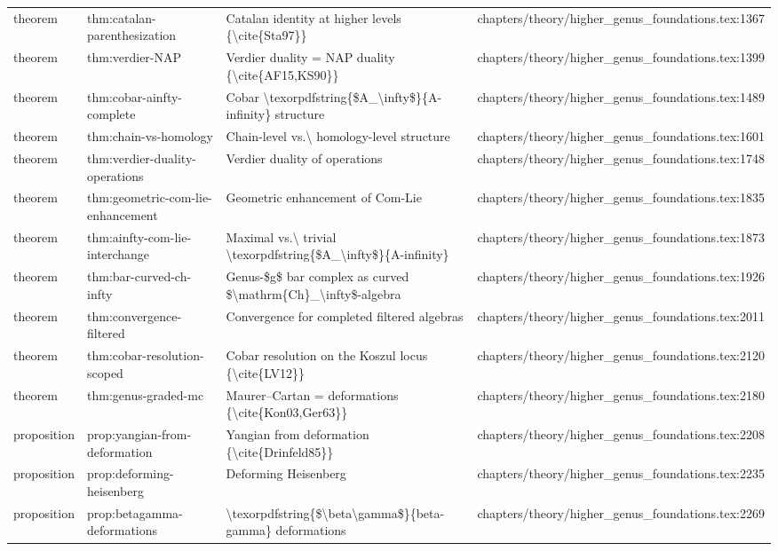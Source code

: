 \documentclass[11pt]{article}
\begin{document}
\begin{longtable}{L{0.10\textwidth}L{0.26\textwidth}L{0.42\textwidth}L{0.22\textwidth}}
theorem & thm:catalan-parenthesization & Catalan identity at higher levels \{\textbackslash{}cite\{Sta97\}\} & chapters/theory/higher\_genus\_foundations.tex:1367\\
theorem & thm:verdier-NAP & Verdier duality = NAP duality \{\textbackslash{}cite\{AF15,KS90\}\} & chapters/theory/higher\_genus\_foundations.tex:1399\\
theorem & thm:cobar-ainfty-complete & Cobar \textbackslash{}texorpdfstring\{\$A\_\textbackslash{}infty\$\}\{A-infinity\} structure & chapters/theory/higher\_genus\_foundations.tex:1489\\
theorem & thm:chain-vs-homology & Chain-level vs.\textbackslash{} homology-level structure & chapters/theory/higher\_genus\_foundations.tex:1601\\
theorem & thm:verdier-duality-operations & Verdier duality of operations & chapters/theory/higher\_genus\_foundations.tex:1748\\
theorem & thm:geometric-com-lie-enhancement & Geometric enhancement of Com-Lie & chapters/theory/higher\_genus\_foundations.tex:1835\\
theorem & thm:ainfty-com-lie-interchange & Maximal vs.\textbackslash{} trivial \textbackslash{}texorpdfstring\{\$A\_\textbackslash{}infty\$\}\{A-infinity\} & chapters/theory/higher\_genus\_foundations.tex:1873\\
theorem & thm:bar-curved-ch-infty & Genus-\$g\$ bar complex as curved \$\textbackslash{}mathrm\{Ch\}\_\textbackslash{}infty\$-algebra & chapters/theory/higher\_genus\_foundations.tex:1926\\
theorem & thm:convergence-filtered & Convergence for completed filtered algebras & chapters/theory/higher\_genus\_foundations.tex:2011\\
theorem & thm:cobar-resolution-scoped & Cobar resolution on the Koszul locus \{\textbackslash{}cite\{LV12\}\} & chapters/theory/higher\_genus\_foundations.tex:2120\\
theorem & thm:genus-graded-mc & Maurer--Cartan = deformations \{\textbackslash{}cite\{Kon03,Ger63\}\} & chapters/theory/higher\_genus\_foundations.tex:2180\\
proposition & prop:yangian-from-deformation & Yangian from deformation \{\textbackslash{}cite\{Drinfeld85\}\} & chapters/theory/higher\_genus\_foundations.tex:2208\\
proposition & prop:deforming-heisenberg & Deforming Heisenberg & chapters/theory/higher\_genus\_foundations.tex:2235\\
proposition & prop:betagamma-deformations & \textbackslash{}texorpdfstring\{\$\textbackslash{}beta\textbackslash{}gamma\$\}\{beta-gamma\} deformations & chapters/theory/higher\_genus\_foundations.tex:2269\\

\end{longtable}
\end{document}
